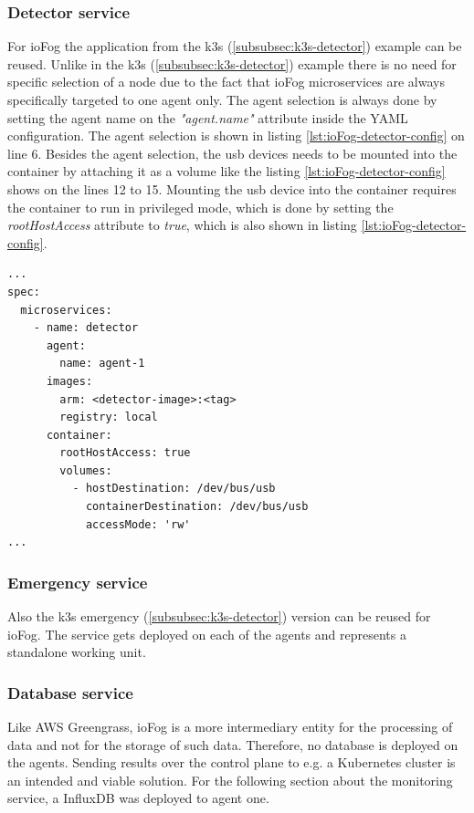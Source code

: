 \subsubsection*{Detector service}
For ioFog the application from the k3s (\ref{subsubsec:k3s-detector}) example can be reused. Unlike in the k3s (\ref{subsubsec:k3s-detector}) example there is no need for specific selection of a node due to the fact that ioFog microservices are always specifically targeted to one agent only. The agent selection is always done by setting the agent name on the \textit{"agent.name"} attribute inside the YAML configuration. The agent selection is shown in listing \ref{lst:ioFog-detector-config} on line 6. Besides the agent selection, the \gls{usb} devices needs to be mounted into the container by attaching it as a volume like the listing \ref{lst:ioFog-detector-config} shows on the lines 12 to 15. Mounting the \gls{usb} device into the container requires the container to run in privileged mode, which is done by setting the \textit{rootHostAccess} attribute to \textit{true}, which is also shown in listing \ref{lst:ioFog-detector-config}.

\begin{lstlisting}[caption={Example detector microservice configuration.},label={lst:ioFog-detector-config},captionpos=b]
...
spec:
  microservices:
    - name: detector
      agent:
        name: agent-1
      images:
        arm: <detector-image>:<tag>
        registry: local
      container:
        rootHostAccess: true
        volumes:
          - hostDestination: /dev/bus/usb
            containerDestination: /dev/bus/usb
            accessMode: 'rw'
...
\end{lstlisting}

\subsubsection*{Emergency service}
Also the k3s emergency (\ref{subsubsec:k3s-detector}) version can be reused for ioFog. The service gets deployed on each of the agents and represents a standalone working unit. 

\subsubsection*{Database service}
Like \gls{AWS} Greengrass, ioFog is a more intermediary entity for the processing of data and not for the storage of such data. Therefore, no database is deployed on the agents. Sending results over the control plane to e.g. a Kubernetes cluster is an intended and viable solution. For the following section about the monitoring service, a InfluxDB was deployed to agent one.

